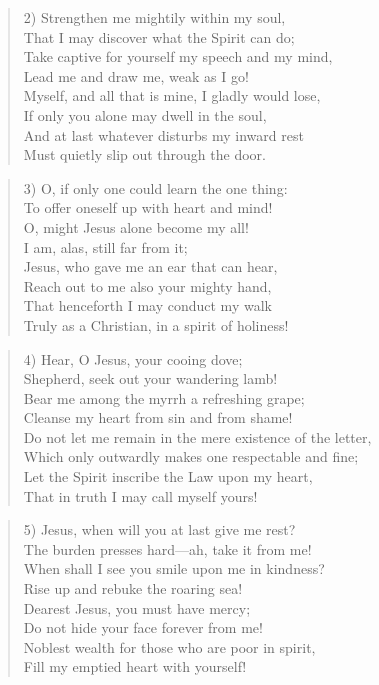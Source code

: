 \begin{verse}
2) Strengthen me mightily within my soul,\\
That I may discover what the Spirit can do;\\
Take captive for yourself my speech and my mind,\\
Lead me and draw me, weak as I go!\\
Myself, and all that is mine, I gladly would lose,\\
If only you alone may dwell in the soul,\\
And at last whatever disturbs my inward rest\\
Must quietly slip out through the door.\\
\end{verse}

\begin{verse}
3) O, if only one could learn the one thing:\\
To offer oneself up with heart and mind!\\
O, might Jesus alone become my all!\\
I am, alas, still far from it;\\
Jesus, who gave me an ear that can hear,\\
Reach out to me also your mighty hand,\\
That henceforth I may conduct my walk\\
Truly as a Christian, in a spirit of holiness!\\
\end{verse}

\begin{verse}
4) Hear, O Jesus, your cooing dove;\\
Shepherd, seek out your wandering lamb!\\
Bear me among the myrrh a refreshing grape;\\
Cleanse my heart from sin and from shame!\\
Do not let me remain in the mere existence of the letter,\\
Which only outwardly makes one respectable and fine;\\
Let the Spirit inscribe the Law upon my heart,\\
That in truth I may call myself yours!\\
\end{verse}

\begin{verse}
5) Jesus, when will you at last give me rest?\\
The burden presses hard—ah, take it from me!\\
When shall I see you smile upon me in kindness?\\
Rise up and rebuke the roaring sea!\\
Dearest Jesus, you must have mercy;\\
Do not hide your face forever from me!\\
Noblest wealth for those who are poor in spirit,\\
Fill my emptied heart with yourself!\\
\end{verse}

